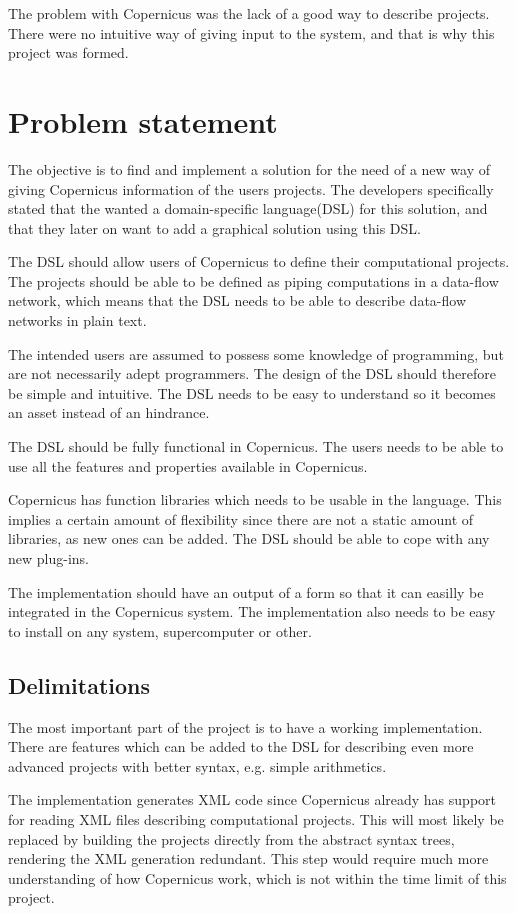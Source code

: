 The problem with Copernicus was the lack of a good way to describe
projects. There were no intuitive way of giving input to the system,
and that is why this project was formed.


\section{Problem statement}
The objective is to find and implement a solution for the need of a
new way of giving Copernicus information of the users projects. The
developers specifically stated that the wanted a domain-specific
language(DSL) for this solution, and that they later on want to add a
graphical solution using this DSL.

The DSL should allow users of Copernicus to define their computational
projects. The projects should be able to be defined as piping
computations in a data-flow network, which means that the DSL needs to
be able to describe data-flow networks in plain text.

The intended users are assumed to possess some knowledge of
programming, but are not necessarily adept programmers. The design of
the DSL should therefore be simple and intuitive. The DSL needs to be
easy to understand so it becomes an asset instead of an hindrance.

The DSL should be fully functional in Copernicus. The users needs to
be able to use all the features and properties available in
Copernicus.

Copernicus has function libraries which needs to be usable in the
language. This implies a certain amount of flexibility since there are
not a static amount of libraries, as new ones can be added. The DSL
should be able to cope with any new plug-ins.

The implementation should have an output of a form so that it can
easilly be integrated in the Copernicus system. The implementation
also needs to be easy to install on any system, supercomputer or
other.

\subsection{Delimitations}
The most important part of the project is to have a working
implementation. There are features which can be added to the DSL for
describing even more advanced projects with better syntax, e.g. simple
arithmetics.

The implementation generates XML code since Copernicus already has
support for reading XML files describing computational projects. This
will most likely be replaced by building the projects directly from
the abstract syntax trees, rendering the XML generation
redundant. This step would require much more understanding of how
Copernicus work, which is not within the time limit of this project.

